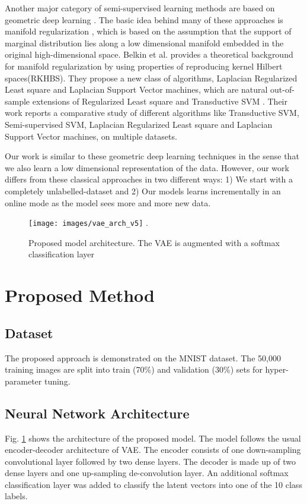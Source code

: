 \documentclass[runningheads]{llncs}
\begin{document}
Another major category of semi-supervised learning methods are based on geometric deep learning \cite{li_2018}\cite{mikhail_2006}\cite{ding_2018}.
The basic idea behind many of these approaches is manifold regularization \cite{mikhail_2006} \cite{ding_2018}, which is based on the assumption that the support of marginal distribution lies along a low dimensional manifold embedded in the original high-dimensional space.
Belkin et al. \cite{mikhail_2006} provides a theoretical background for manifold regularization by using properties of reproducing kernel Hilbert spaces(RKHBS).
They propose a new class of algorithms, Laplacian Regularized Least square and Laplacian Support Vector machines, which are natural out-of-sample extensions of Regularized Least square and Transductive SVM \cite{joachims_1999}.
Their work reports a comparative study of different algorithms like Transductive SVM\cite{joachims_1999}, Semi-supervised SVM\cite{bennett_1999}, Laplacian Regularized Least square and Laplacian Support Vector machines, on multiple datasets.

Our work is similar to these geometric deep learning techniques in the sense that we also learn a low dimensional representation of the data.
However, our work differs from these classical approaches in two different ways: 1) We start with a completely unlabelled-dataset and 2) Our models learns incrementally in an online mode as the model sees more and more new data.

\begin{figure}[!t]
\centering
\texttt{[image: images/vae\_arch\_v5]}
\DeclareGraphicsExtensions.
\caption{Proposed model architecture. The VAE is augmented with a softmax classification layer}
\label{vae_architecture}
\end{figure}
\section{Proposed Method}

\subsection{Dataset}
The proposed approach is demonstrated on the MNIST dataset.
The 50,000 training images are split into train (70\%) and validation (30\%) sets for hyper-parameter tuning.

\subsection{Neural Network Architecture}
Fig. \ref{vae_architecture} shows the architecture of the proposed model.
The model follows the usual encoder-decoder architecture of VAE.
The encoder consists of one down-sampling convolutional layer followed by two dense layers.
The decoder is made up of two dense layers and one up-sampling de-convolution layer.
An additional softmax classification layer was added to classify the latent vectors into one of the 10 class labels.
\end{document}
